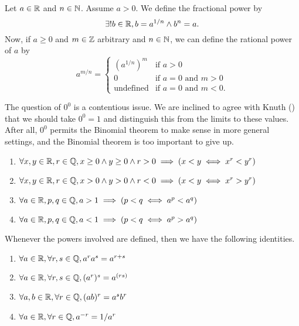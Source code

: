 \begin{definition}
Let $a\in\mathbb{R}$ and $n\in\mathbb{N}$. Assume $a>0$. We define the fractional
power by
\begin{equation}
\exists!b\in\mathbb{R},b=a^{1/n}\land b^{n}=a.
\end{equation}
Now, if $a\geq0$ and $m\in\mathbb{Z}$ arbitrary and $n\in\mathbb{N}$, we can define the
rational power of $a$ by
\begin{equation}
a^{m/n} = \begin{cases}
     (a^{1/n})^{m} & \mbox{if } a > 0\\
               0 & \mbox{if } a=0 \mbox{ and } m>0\\
\mbox{undefined} & \mbox{if } a=0\mbox{ and } m < 0.
\end{cases}
\end{equation}
\end{definition}

\begin{remark}
The question of $0^{0}$ is a contentious issue. We are inclined to agree
with Knuth () that we should take $0^{0}=1$ and distinguish this
from the limits to these values. After all, $0^{0}$ permits the Binomial
theorem to make sense in more general settings, and the Binomial theorem
is too important to give up.
\end{remark}

\begin{enumerate}[resume*]
\item $\forall x,y\in\mathbb{R},r\in\mathbb{Q}, x\geq0\land y\geq0\land r>0\implies(x<y\iff x^{r}<y^{r})$
\item $\forall x,y\in\mathbb{R},r\in\mathbb{Q}, x>0\land y>0\land r<0\implies(x<y\iff x^{r}>y^{r})$
\item $\forall a\in\mathbb{R},p,q\in\mathbb{Q}, a>1\implies (p<q\iff a^{p}<a^{q})$
\item $\forall a\in\mathbb{R},p,q\in\mathbb{Q}, a<1\implies (p<q\iff a^{p}>a^{q})$
\end{enumerate}

 Whenever the powers involved are defined, then we
have the following identities.
\begin{enumerate}[resume*]
\item $\forall a\in\mathbb{R},\forall r,s\in\mathbb{Q},a^{r}a^{s}=a^{r+s}$
\item $\forall a\in\mathbb{R},\forall r,s\in\mathbb{Q},(a^{r})^{s}=a^{(rs)}$
\item $\forall a,b\in\mathbb{R},\forall r\in\mathbb{Q},(ab)^{r}=a^{s}b^{r}$
\item $\forall a\in\mathbb{R},\forall r\in\mathbb{Q}, a^{-r} = 1/a^{r}$
\end{enumerate}
